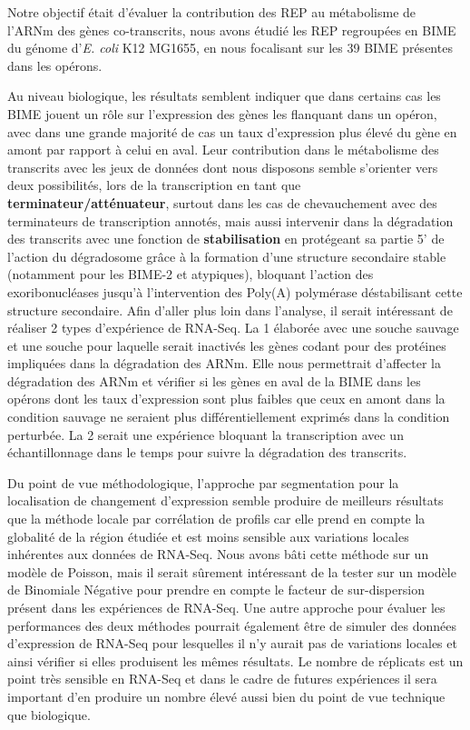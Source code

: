 \documentclass[12pt,a4paper]{report}
\begin{document}
\begin{onehalfspace}
Notre objectif était d'évaluer la contribution des REP au métabolisme de l'ARNm des gènes co-transcrits, nous avons étudié les REP regroupées en BIME du génome d'\textit{E. coli} K12 MG1655, en nous focalisant sur les 39 BIME présentes dans les opérons.

Au niveau biologique, les résultats semblent indiquer que dans certains cas les BIME jouent un rôle sur l'expression des gènes les flanquant dans un opéron, avec dans une grande majorité de cas un taux d'expression plus élevé du gène en amont par rapport à celui en aval. Leur contribution dans le métabolisme des transcrits avec les jeux de données dont nous disposons semble s'orienter vers deux possibilités, lors de la transcription en tant que \textbf{terminateur/atténuateur}, surtout dans les cas de chevauchement avec des terminateurs de transcription annotés, mais aussi intervenir dans la dégradation des transcrits avec une fonction de \textbf{stabilisation} en protégeant sa partie 5' de l'action du dégradosome grâce à la formation d'une structure secondaire stable (notamment pour les BIME-2  et atypiques), bloquant l'action des exoribonucléases jusqu'à l'intervention des Poly(A) polymérase déstabilisant cette structure secondaire. 
Afin d'aller plus loin dans l'analyse, il serait intéressant de réaliser 2 types d'expérience de RNA-Seq. La 1 élaborée avec une souche sauvage et une souche pour laquelle serait inactivés les gènes codant pour des protéines impliquées dans la dégradation des ARNm. Elle nous permettrait d'affecter la dégradation des ARNm et vérifier si les gènes en aval de la BIME dans les opérons dont les taux d'expression sont plus faibles que ceux en amont dans la condition sauvage ne seraient plus différentiellement exprimés dans la condition perturbée. La 2 serait une expérience bloquant la transcription avec un échantillonnage dans le temps pour suivre la dégradation des transcrits.

Du point de vue méthodologique, l'approche par segmentation pour la localisation de changement d'expression semble produire de meilleurs résultats que la méthode locale par corrélation de profils car elle prend en compte la globalité de la région étudiée et est moins sensible aux variations locales inhérentes aux données de RNA-Seq. Nous avons bâti cette méthode sur un modèle de Poisson, mais il serait sûrement intéressant de la tester sur un modèle de Binomiale Négative pour prendre en compte le facteur de sur-dispersion présent dans les expériences de RNA-Seq. Une autre approche pour évaluer les performances des deux méthodes pourrait également être de simuler des données d'expression de RNA-Seq pour lesquelles il n'y aurait pas de variations locales et ainsi vérifier si elles produisent les mêmes résultats.
Le nombre de réplicats est un point très sensible en RNA-Seq et dans le cadre de futures expériences il sera important d'en produire un nombre élevé aussi bien du point de vue technique que biologique.

\end{onehalfspace}
\end{document}
